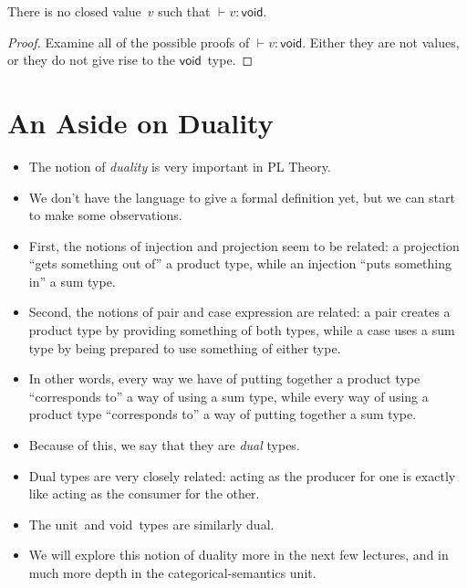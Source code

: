 \documentclass{lecturenotes}
\newcommand{\utype}{\textsf{unit}\xspace}
\newcommand{\vtype}{\textsf{void}\xspace}
\begin{document}
\begin{thm}
  There is no closed value~$v$ such that $\vdash v \colon \vtype$.
\end{thm}
\begin{proof}
  Examine all of the possible proofs of $\vdash v : \vtype$.
  Either they are not values, or they do not give rise to the $\vtype$~type. 
\end{proof}

\section{An Aside on Duality}
\label{sec:an-aside-duality}

\begin{itemize}
\item The notion of \emph{duality} is very important in PL Theory.
\item We don't have the language to give a formal definition yet, but we can start to make some observations.
\item First, the notions of injection and projection seem to be related: a projection ``gets something out of'' a product type, while an injection ``puts something in'' a sum type.
\item Second, the notions of pair and case expression are related: a pair creates a product type by providing something of both types, while a case uses a sum type by being prepared to use something of either type.
\item In other words, every way we have of putting together a product type ``corresponds to'' a way of using a sum type, while every way of using a product type ``corresponds to'' a way of putting together a sum type.
\item Because of this, we say that they are \emph{dual} types.
\item Dual types are very closely related: acting as the producer for one is exactly like acting as the consumer for the other.
\item The \utype~and \vtype~types are similarly dual.
\item We will explore this notion of duality more in the next few lectures, and in much more depth in the categorical-semantics unit.
\end{itemize}
\end{document}
